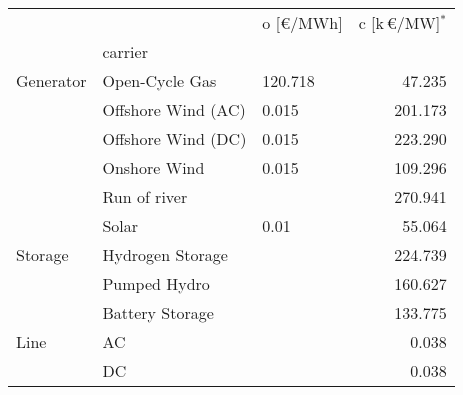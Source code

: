 \begin{tabular}{lllr}
\toprule
     &    & o [\euro/MWh] &  c [k\,\euro/MW]$^*$ \\
{} & carrier &               &                      \\
\midrule
Generator & Open-Cycle Gas &       120.718 &               47.235 \\
     & Offshore Wind (AC) &         0.015 &              201.173 \\
     & Offshore Wind (DC) &         0.015 &              223.290 \\
     & Onshore Wind &         0.015 &              109.296 \\
     & Run of river &               &              270.941 \\
     & Solar &          0.01 &               55.064 \\
Storage & Hydrogen Storage &               &              224.739 \\
     & Pumped Hydro &               &              160.627 \\
     & Battery Storage &               &              133.775 \\
Line & AC &               &                0.038 \\
     & DC &               &                0.038 \\
\bottomrule
\end{tabular}
